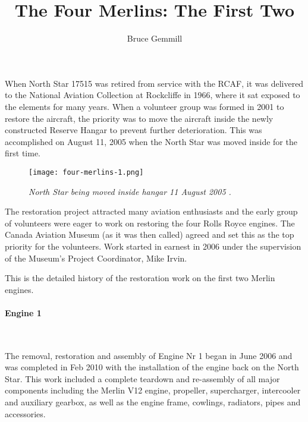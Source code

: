 %


\title{The Four Merlins: The First Two}
\author{Bruce Gemmill}

\maketitle

When North Star 17515 was retired from service with the RCAF, it was delivered
to the National Aviation Collection at Rockcliffe  in 1966, where it sat
exposed to the elements for many years. When a volunteer group was formed in
2001 to restore the aircraft, the priority was to move the aircraft inside the
newly constructed Reserve Hangar to prevent further deterioration.  This was
accomplished on August 11, 2005 when the North Star was moved inside for the
first time.

\begin{figure}[H]
   \vspace{2em}
   \centering
   \texttt{[image: four-merlins-1.png]}
   \caption*{\small \em North Star being moved inside hangar 11 August 2005 .}
   \label{fig:tim}
\end{figure}

The restoration project attracted many aviation enthusiasts and the early group
of volunteers were eager to work on restoring the four Rolls Royce engines. The
Canada Aviation Museum (as it was then called) agreed and set this as the top
priority for the volunteers.  Work started in earnest in 2006 under the
supervision of the Museum's Project Coordinator, Mike Irvin.

This is the detailed  history of the restoration work on the first two Merlin
engines.

\paragraph*{Engine 1}\

The removal, restoration and assembly of Engine Nr 1 began in June 2006 and was
completed in Feb 2010 with the installation of the engine back on the North
Star.  This work included a complete teardown and re-assembly of all major
components including the Merlin V12 engine, propeller, supercharger,
intercooler and auxiliary gearbox, as well as the engine frame, cowlings,
radiators, pipes and accessories. 

